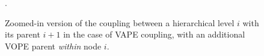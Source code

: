 \begin{figure}
  \caption{Zoomed-in version of the coupling between a hierarchical level $i$ with its parent $i+1$ in the case of \textsf{VAPE} coupling, with an additional \textsf{VOPE} parent \textit{within} node $i$.}.
  \label{\figlabel}
\end{figure}
